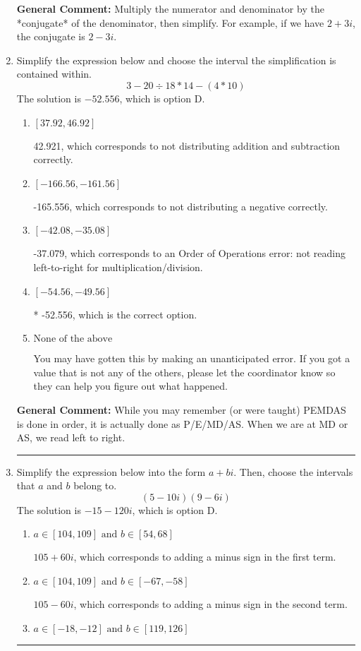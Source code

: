 \documentclass{extbook}[14pt]
\newcommand{\litem}[1]{\item #1

\rule{\textwidth}{0.4pt}}
\begin{document}
\begin{enumerate}
{\textbf{General Comment:} Multiply the numerator and denominator by the *conjugate* of the denominator, then simplify. For example, if we have $2+3i$, the conjugate is $2-3i$.
}
\litem{
Simplify the expression below and choose the interval the simplification is contained within.
\[ 3 - 20 \div 18 * 14 - (4 * 10) \]The solution is \( -52.556 \), which is option D.\begin{enumerate}[label=\Alph*.]
\item \( [37.92, 46.92] \)

 42.921, which corresponds to not distributing addition and subtraction correctly.
\item \( [-166.56, -161.56] \)

 -165.556, which corresponds to not distributing a negative correctly.
\item \( [-42.08, -35.08] \)

 -37.079, which corresponds to an Order of Operations error: not reading left-to-right for multiplication/division.
\item \( [-54.56, -49.56] \)

* -52.556, which is the correct option.
\item \( \text{None of the above} \)

 You may have gotten this by making an unanticipated error. If you got a value that is not any of the others, please let the coordinator know so they can help you figure out what happened.
\end{enumerate}

\textbf{General Comment:} While you may remember (or were taught) PEMDAS is done in order, it is actually done as P/E/MD/AS. When we are at MD or AS, we read left to right.
}
\litem{
Simplify the expression below into the form $a+bi$. Then, choose the intervals that $a$ and $b$ belong to.
\[ (5 - 10 i)(9 - 6 i) \]The solution is \( -15 - 120 i \), which is option D.\begin{enumerate}[label=\Alph*.]
\item \( a \in [104, 109] \text{ and } b \in [54, 68] \)

 $105 + 60 i$, which corresponds to adding a minus sign in the first term.
\item \( a \in [104, 109] \text{ and } b \in [-67, -58] \)

 $105 - 60 i$, which corresponds to adding a minus sign in the second term.
\item \( a \in [-18, -12] \text{ and } b \in [119, 126] \)


\end{enumerate}}
\end{enumerate}
\end{document}
